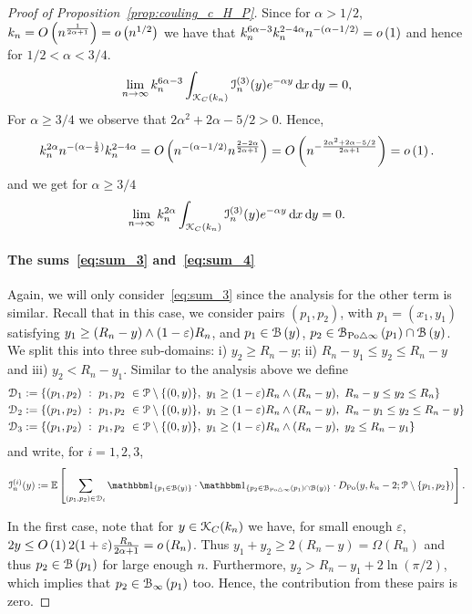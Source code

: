 \begin{proof}[Proof of Proposition~\ref{prop:couling_c_H_P}]
Since for $\alpha > 1/2$, $k_n = O\left(n^{\frac{1}{2\alpha +1}}\right) = o\left(n^{1/2}\right)$ we have that $k_n^{6\alpha - 3} k_n^{2 - 4\alpha} n^{-(\alpha - 1/2)} = o\left(1\right)$ and hence for $1/2 < \alpha < 3/4$.
\[
	\lim_{n \to \infty} k_n^{6\alpha - 3} \int_{{\mathcal K}_{C}(k_n)} \mathcal{I}_n^{(3)}(y) e^{-\alpha y} \operatorname{\mathrm{d}\hspace{-2pt}} x \operatorname{\mathrm{d}\hspace{-2pt}} y = 0,
\]
For $\alpha \ge 3/4$ we observe that $2\alpha^2 + 2\alpha - 5/2 > 0$. Hence,
\[
	k_n^{2\alpha} n^{-(\alpha - \frac{1}{2})} k_n^{2 -4\alpha} 
	= O\left(n^{-(\alpha - 1/2)} n^{\frac{2 - 2\alpha}{2\alpha + 1}}\right)
 	= O\left(n^{- \frac{2\alpha^2 + 2\alpha - 5/2}{2\alpha + 1}}\right) = o\left(1\right).
\]
and we get for $\alpha \ge 3/4$
\[
	\lim_{n \to \infty} k_n^{2\alpha} \int_{{\mathcal K}_{C}(k_n)} \mathcal{I}_n^{(3)}(y) e^{-\alpha y} \operatorname{\mathrm{d}\hspace{-2pt}} x \operatorname{\mathrm{d}\hspace{-2pt}} y = 0.
\]



\paragraph{The sums~\eqref{eq:sum_3} and~\eqref{eq:sum_4}}
Again, we will only consider~\eqref{eq:sum_3} since the analysis for the other term is similar. Recall that in this case, we consider pairs $(p_1,p_2)$, with $p_1 = (x_1,y_1)$ satisfying 
$y_1 \geq (R_n - y) \wedge (1-\varepsilon)R_n$, and $p_1 \in {\mathcal B}\left(y\right)$, $p_2 \in {\mathcal B}_{{\mathrm{Po}} \bigtriangleup \infty}\left(p_1\right) \cap {\mathcal B}\left(y\right)$. 
We split this into three sub-domains:  i) $y_2 \geq R_n - y$; ii) $R_n -y_1 \leq y_2 \leq R_n -y$ and iii) $y_2 < R_n - y_1$. Similar to the analysis above we define
\begin{align*}
	\mathcal{D}_{1} &:= \{(p_1, p_2) \ : \  p_1,p_2 \ \in {\mathcal P} \setminus \{(0,y) \}, \ y_1 \geq (1-\varepsilon) R_n \wedge (R_n-y), 
		\ R_n -y \leq y_2 \leq R_n \}\\
	\mathcal{D}_{2} &:= \{(p_1, p_2) \ : \  p_1,p_2 \ \in {\mathcal P} \setminus \{(0,y) \}, \ y_1 \geq (1-\varepsilon) R_n \wedge (R_n-y), 
		\ R_n -y_1 \leq y_2 \leq R_n - y \}\\
	\mathcal{D}_{3} &:= \{(p_1, p_2) \ : \  p_1,p_2 \ \in {\mathcal P} \setminus \{(0,y) \}, \ y_1 \geq (1-\varepsilon) R_n \wedge (R_n-y), 
		\ y_2 \leq R_n - y_1 \}
\end{align*}
and write, for $i = 1,2,3$,
\[
	\mathcal{I}_n^{(i)}(y) := \Exp { \sum_{(p_1,p_2)  \in \dom{i}} 
	\ind{p_1 \in \BallHyp{y}} \cdot \ind{p_2 \in \BallSym{p_1} \cap \BallHyp{y}}
	\cdot D_{\Po} (y,k_n-2;\Pcal \setminus \{ p_1, p_2\})}.
\]


In the first case, note that for $y \in {\mathcal K}_{C}(k_n)$ we have, for small enough $\varepsilon$, $2y \le O\left(1\right) 2(1+\varepsilon)
\frac{R_n}{2\alpha +1} = o\left(R_n\right)$. Thus $y_1 + y_2 \geq 2(R_n - y) = \Omega(R_n)$ and thus $p_2 \in {\mathcal B}\left(p_1\right)$ for large enough $n$. Furthermore, 
$y_2 > R_n - y_1 + 2\ln (\pi/2)$, which implies that $p_2 \in {\mathcal B}_{\infty}\left(p_1\right)$ too. 
Hence, the contribution from these pairs is zero.   


\end{proof}
